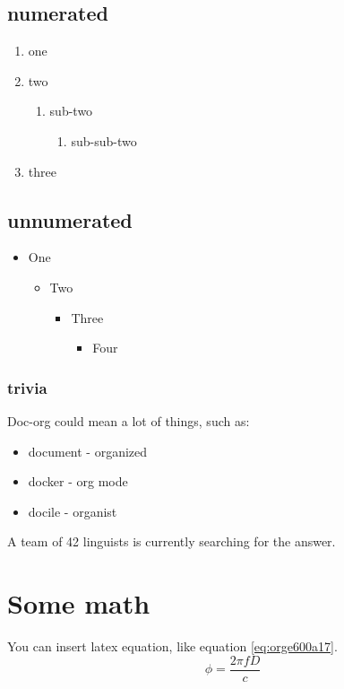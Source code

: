 \subsection{numerated}
\label{sec:org07f4416}
\begin{enumerate}
\item one
\item two
\begin{enumerate}
\item sub-two
\begin{enumerate}
\item sub-sub-two
\end{enumerate}
\end{enumerate}
\item three
\end{enumerate}

\subsection{unnumerated}
\label{sec:org14e9abc}
\begin{itemize}
\item One
\begin{itemize}
\item Two
\begin{itemize}
\item Three
\begin{itemize}
\item Four
\end{itemize}
\end{itemize}
\end{itemize}
\end{itemize}

\subsubsection{trivia}
\label{sec:org5655fff}
Doc-org could mean a lot of things, such as:
\begin{itemize}
\item document - organized
\item docker - org mode
\item docile - organist
\end{itemize}
A team of 42 linguists is currently searching for the answer.

\section{Some math}
\label{sec:org50fadf7}
You can insert latex equation, like equation \ref{eq:orge600a17}.
\begin{equation}
\label{eq:orge600a17}
\phi = \frac{2\pi fD}{c}
\end{equation}

